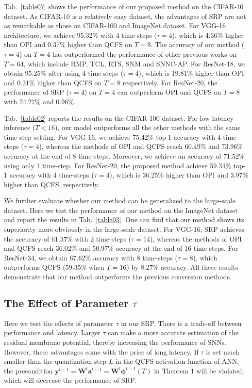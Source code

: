 \documentclass[letterpaper]{article} %
\begin{document}
Tab.~\ref{table07} shows the performance of our proposed method on the CIFAR-10 dataset. As CIFAR-10 is a relatively easy dataset, the advantages of SRP are not as remarkable as those on CIFAR-100 and ImageNet dataset. For VGG-16 architecture, we achieve 95.32\% with 4 time-steps ($\tau=4$), which is 4.36\% higher than OPI and 0.37\% higher than QCFS on $T=8$. The accuracy of our method ($\tau=4$) on $T=4$ has outperformed the performance of other previous works on $T=64$, which include RMP, TCL, RTS, SNM and SNNC-AP. For ResNet-18, we obtain 95.25\% after using 4 time-steps ($\tau=4$), which is 19.81\% higher than OPI and 0.21\% higher than QCFS on $T=8$ respectively. For ResNet-20, the performance of SRP ($\tau=4$) on $T=4$ can outperform OPI and QCFS on $T=8$ with 24.27\% and 0.96\%.


Tab.~\ref{table02} reports the results on the CIFAR-100 dataset. For low latency inference ($T<16$), our model outperforms all the other methods with the same time-step setting. For VGG-16, we achieve 75.42\% top-1 accuracy with 4 time-steps ($\tau=4$), whereas the methods of OPI and QCFS
reach 60.49\% and 73.96\% accuracy at the end of 8 time-steps. Moreover, we achieve an accuracy of 71.52\% using only 1 time-step. For ResNet-20, the proposed method achieve 59.34\% top-1 accuracy with 4 time-steps ($\tau=4$), which is 36.25\% higher than OPI and 3.97\% higher than QCFS, respectively.



We further evaluate whether our method can be generalized to the large-scale dataset. Here we test the performance of our method on the ImageNet dataset and report the results in Tab.~\ref{table03}. One can find that our method shows its superiority more obviously in the large-scale dataset. For VGG-16, SRP achieves the accuracy of 61.37\% with 2 time-steps ($\tau=14$), whereas the methods of OPI and QCFS reach 36.02\% and 50.97\% accuracy at the end of 16 time-steps. For ResNet-34, we obtain 67.62\% accuracy with 8 time-steps ($\tau=8$), which outperforms QCFS (59.35\% when $T=16$) by 8.27\% accuracy. All these results demonstrate that our method outperforms the previous conversion methods.










\subsection{The Effect of Parameter $\tau$}
Here we test the effects of parameter $\tau$  in our SRP. There is a trade-off between performance and latency. Larger $\tau$ can make a more accurate estimation of the residual membrane potential, thereby increasing the performance of SNNs. However, these advantages come with the price of long latency. If $\tau$ is set much smaller than the quantization step $L$ in the QCFS activation function of ANN, the precondition $\boldsymbol{y}^{l-1} = \boldsymbol{W}^{l} \boldsymbol{a}^{l-1}= \boldsymbol{W}^{l}\boldsymbol{\phi}^{l-1}(T)$ in Theorem 1 will be violated, which will decrease the performance of SRP.
\end{document}
